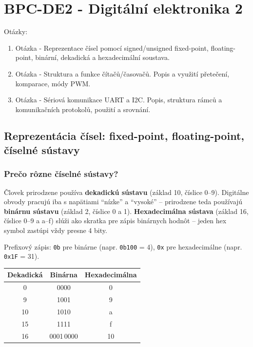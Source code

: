 \part{BPC-DE2 - Digitální elektronika 2}
\begin{huge}
	Otázky:
	\newline
\end{huge}
\begin{enumerate}
	\item Otázka - Reprezentace čísel pomocí signed/unsigned fixed-point, floating-point, binární, dekadická a hexadecimální soustava. 
	\item Otázka - Struktura a funkce čítačů/časovačů. Popis a využití přetečení, komparace, módy PWM. 
	\item Otázka - Sériová komunikace UART a I2C. Popis, struktura rámců a komunikačních protokolů, použití a srovnání.
	
\end{enumerate}
\chapter{Reprezentácia čísel: fixed-point, floating-point, číselné sústavy}

\section{Prečo rôzne číselné sústavy?}

Človek prirodzene používa \textbf{dekadickú sústavu} (základ 10, číslice 0--9). Digitálne obvody pracujú iba s napätiami ``nízke'' a ``vysoké'' -- prirodzene teda používajú \textbf{binárnu sústavu} (základ 2, číslice 0 a 1). \textbf{Hexadecimálna sústava} (základ 16, číslice 0--9 a a--f) slúži ako skratka pre zápis binárnych hodnôt -- jeden hex symbol zastúpi vždy presne 4 bity.

Prefixový zápis: \texttt{0b} pre binárne (napr. \texttt{0b100} = 4), \texttt{0x} pre hexadecimálne (napr. \texttt{0x1F} = 31).

\begin{center}
\begin{tabular}{ccc}
\toprule
\textbf{Dekadická} & \textbf{Binárna} & \textbf{Hexadecimálna} \\
\midrule
0  & 0000 & 0 \\
9  & 1001 & 9 \\
10 & 1010 & a \\
15 & 1111 & f \\
16 & 0001\,0000 & 10 \\
\bottomrule
\end{tabular}
\end{center}

